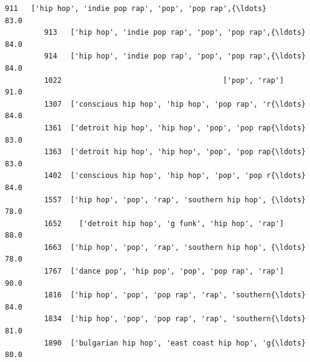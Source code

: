 \documentclass[11pt]{article}
\begin{document}
\begin{Verbatim}[commandchars=\\\{\}]
         911   ['hip hop', 'indie pop rap', 'pop', 'pop rap',{\ldots}               83.0   
         913   ['hip hop', 'indie pop rap', 'pop', 'pop rap',{\ldots}               84.0   
         914   ['hip hop', 'indie pop rap', 'pop', 'pop rap',{\ldots}               84.0   
         1022                                     ['pop', 'rap']               91.0   
         1307  ['conscious hip hop', 'hip hop', 'pop rap', 'r{\ldots}               84.0   
         1361  ['detroit hip hop', 'hip hop', 'pop', 'pop rap{\ldots}               83.0   
         1363  ['detroit hip hop', 'hip hop', 'pop', 'pop rap{\ldots}               83.0   
         1402  ['conscious hip hop', 'hip hop', 'pop', 'pop r{\ldots}               84.0   
         1557  ['hip hop', 'pop', 'rap', 'southern hip hop', {\ldots}               78.0   
         1652    ['detroit hip hop', 'g funk', 'hip hop', 'rap']               88.0   
         1663  ['hip hop', 'pop', 'rap', 'southern hip hop', {\ldots}               78.0   
         1767  ['dance pop', 'hip pop', 'pop', 'pop rap', 'rap']               90.0   
         1816  ['hip hop', 'pop', 'pop rap', 'rap', 'southern{\ldots}               84.0   
         1834  ['hip hop', 'pop', 'pop rap', 'rap', 'southern{\ldots}               81.0   
         1890  ['bulgarian hip hop', 'east coast hip hop', 'g{\ldots}               80.0   
         

\end{Verbatim}
\end{document}

